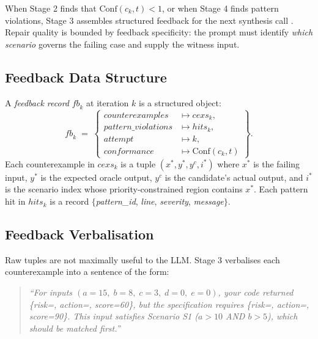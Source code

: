When Stage 2 finds that $\mathrm{Conf}(c_k, t) < 1$, or when Stage 4 finds
pattern violations, Stage 3 assembles structured feedback for the next
synthesis call \citep{lynn2024verifierloop, solarlezama2008sketching}.
Repair quality is bounded by feedback specificity: the prompt must identify
\emph{which scenario} governs the failing case and supply the witness input.

\subsection{Feedback Data Structure}
\label{subsec:method:feedback-struct}

\begin{definition}
\label{def:feedback}
A \emph{feedback record} $\mathit{fb}_k$ at iteration $k$ is a structured
object:
\[
  \mathit{fb}_k \;=\;
  \left\{
  \begin{aligned}
    \mathit{counterexamples}     &\mapsto \mathit{cexs}_k,\\
    \mathit{pattern\_violations} &\mapsto \mathit{hits}_k,\\
    \mathit{attempt}            &\mapsto k,\\
    \mathit{conformance}        &\mapsto \mathrm{Conf}(c_k, t)
  \end{aligned}
  \right\}.
\]
Each counterexample in $\mathit{cexs}_k$ is a tuple
$(x^*, y^*, y^c, i^*)$ where $x^*$ is the failing input, $y^*$ is the
expected oracle output, $y^c$ is the candidate's actual output, and $i^*$ is
the scenario index whose priority-constrained region contains $x^*$.
Each pattern hit in $\mathit{hits}_k$ is a record $\{$\textit{pattern\_id},
\textit{line}, \textit{severity}, \textit{message}$\}$.
\end{definition}

\subsection{Feedback Verbalisation}
\label{subsec:method:verbalise}

Raw tuples are not maximally useful to the LLM.  Stage 3 verbalises each
counterexample into a sentence of the form:

\begin{quote}
  \textit{``For inputs $(a=15,\; b=8,\; c=3,\; d=0,\; e=0)$, your code
  returned \{\textit{risk}=, \textit{action}=,
  \textit{score}=60\}, but the specification requires
  \{\textit{risk}=, \textit{action}=,
  \textit{score}=90\}.
  This input satisfies Scenario S1 ($a > 10$ AND $b > 5$), which should be matched first.''}
\end{quote}

